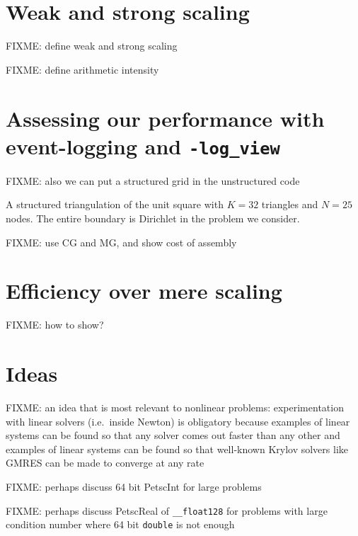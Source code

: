 
\section{Weak and strong scaling}

FIXME: define weak and strong scaling

FIXME: define arithmetic intensity

\section{Assessing our performance with event-logging and \texttt{-log\_view}}

\vspace{4cm}

FIXME: also we can put a structured grid in the unstructured code

\begin{marginfigure}

\caption{A structured triangulation of the unit square with $K=32$ triangles and $N=25$ nodes.  The entire boundary is Dirichlet in the problem we consider.}
\label{fig:structuredfem}
\end{marginfigure}

FIXME: use CG and MG, and show cost of assembly

\section{Efficiency over mere scaling}

FIXME: how to show?

\section{Ideas}

FIXME: an idea that is most relevant to nonlinear problems: experimentation with linear solvers (i.e.~inside Newton) is obligatory because examples of linear systems can be found so that any solver comes out faster than any other \citep{Nachtigaletal1992} and examples of linear systems can be found so that well-known Krylov solvers like GMRES can be made to converge at any rate \citep{Greenbaumetal1996}

FIXME: perhaps discuss 64 bit PetscInt for large problems

FIXME: perhaps discuss PetscReal of \verb|__float128| for problems with large condition number where 64 bit \texttt{double} is not enough